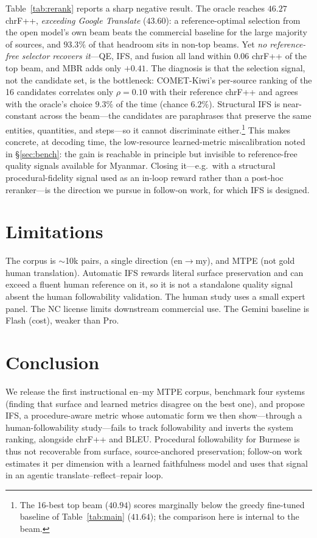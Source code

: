 \documentclass[11pt]{article}
\begin{document}


Table~\ref{tab:rerank} reports a sharp negative result. The oracle reaches $46.27$ chrF++,
\emph{exceeding Google Translate} ($43.60$): a reference-optimal selection from the open
model's own beam beats the commercial baseline for the large majority of sources, and
$93.3\%$ of that headroom sits in non-top beams. Yet \emph{no reference-free selector
recovers it}---QE, IFS, and fusion all land within $0.06$ chrF++ of the top beam, and MBR adds
only $+0.41$. The diagnosis is that the selection signal, not the candidate set, is the
bottleneck: COMET-Kiwi's per-source ranking of the 16 candidates correlates only
$\rho{=}0.10$ with their reference chrF++ and agrees with the oracle's choice $9.3\%$ of the
time (chance $6.2\%$). Structural IFS is near-constant across the beam---the candidates are
paraphrases that preserve the same entities, quantities, and steps---so it cannot discriminate
either.\footnote{The 16-best top beam ($40.94$) scores marginally below the greedy fine-tuned
baseline of Table~\ref{tab:main} ($41.64$); the comparison here is internal to the beam.}
This makes concrete, at decoding time, the low-resource learned-metric miscalibration noted in
\S\ref{sec:bench}: the gain is reachable in principle but invisible to reference-free quality
signals available for Myanmar. Closing it---e.g.\ with a structural procedural-fidelity signal
used as an in-loop reward rather than a post-hoc reranker---is the direction we pursue in
follow-on work, for which IFS is designed.

\section{Limitations}
The corpus is $\sim$10k pairs, a single direction (en$\rightarrow$my), and MTPE (not
gold human translation). Automatic IFS rewards literal surface preservation and can exceed
a fluent human reference on it, so it is not a standalone quality signal absent the human
followability validation. The human study uses a small expert panel. The NC license limits
downstream commercial use. The Gemini baseline is Flash (cost), weaker than Pro.

\section{Conclusion}\label{sec:concl}
We release the first instructional en--my MTPE corpus, benchmark four systems (finding that
surface and learned metrics disagree on the best one), and propose IFS, a procedure-aware
metric whose automatic form we then show---through a human-followability study---fails to track
followability and inverts the system ranking, alongside chrF++ and BLEU. Procedural
followability for Burmese is thus not recoverable from surface, source-anchored preservation;
follow-on work estimates it per dimension with a learned faithfulness model and uses that signal
in an agentic translate--reflect--repair loop.


\end{document}
